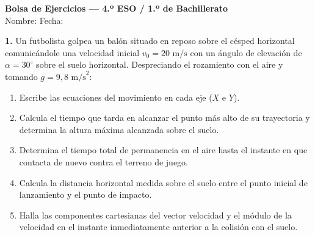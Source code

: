 \documentclass[11pt,a4paper]{article}
\begin{document}
\pagestyle{empty}

\begin{center}
    {\LARGE \textbf{Bolsa de Ejercicios — 4.º ESO / 1.º de Bachillerato}}\\[6pt]
    {\normalsize Nombre: \underline{\hspace{8cm}} \quad Fecha: \underline{\hspace{3cm}}}
\end{center}

\vspace{0.5cm}
\noindent\textbf{1.} Un futbolista golpea un balón situado en reposo sobre el césped horizontal comunicándole una velocidad inicial $v_0 = 20\text{ m/s}$ con un ángulo de elevación de $\alpha = 30^\circ$ sobre el suelo horizontal. Despreciando el rozamiento con el aire y tomando $g = 9{,}8\text{ m/s}^2$:
\begin{enumerate}[label=\textbf{\alph*)}, leftmargin=2em, itemsep=6pt]
    \item Escribe las ecuaciones del movimiento en cada eje ($X$ e $Y$).
    \item Calcula el tiempo que tarda en alcanzar el punto más alto de su trayectoria y determina la altura máxima alcanzada sobre el suelo.
    \item Determina el tiempo total de permanencia en el aire hasta el instante en que contacta de nuevo contra el terreno de juego.
    \item Calcula la distancia horizontal medida sobre el suelo entre el punto inicial de lanzamiento y el punto de impacto.
    \item Halla las componentes cartesianas del vector velocidad y el módulo de la velocidad en el instante inmediatamente anterior a la colisión con el suelo.
\end{enumerate}
\end{document}
